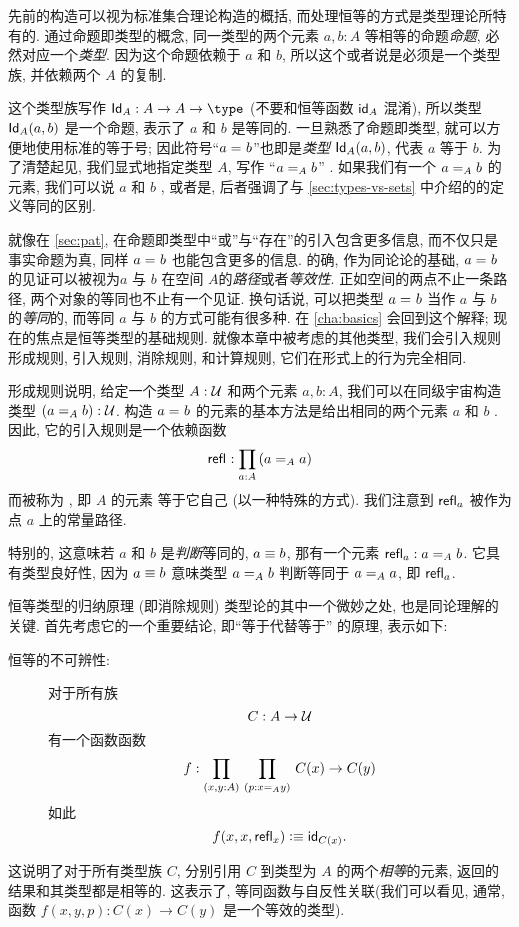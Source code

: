 %
%
%
%
先前的构造可以视为标准集合理论构造的概括, 而处理恒等的方式是类型理论所特有的. 通过命题即类型的概念, 同一类型的两个元素 $a,b:A$ 等相等的命题\emph{命题}, 必然对应一个\emph{类型}. 因为这个命题依赖于 $a$ 和 $b$, 所以这个或者说是必须是一个类型族, 并依赖两个 $A$ 的复制. 

这个类型族写作 $\idtypevar{A}:A\to A\to\type$ (不要和恒等函数 $\idfunc[A]$ 混淆), 所以类型 $\idtype[A]ab$ 是一个命题, 表示了 $a$ 和 $b$ 是等同的. 一旦熟悉了命题即类型, 就可以方便地使用标准的等于号; 因此符号``$\id{a}{b}$''也即是\emph{类型} $\idtype[A]ab$, 代表 $a$ 等于 $b$. 为了清楚起见, 我们显式地指定类型 $A$, 写作 ``$\id[A]{a}{b}$''  . 如果我们有一个 $\id[A]{a}{b}$ 的元素, 我们可以说 $a$ 和 $b$ , 或者是, 后者强调了与 \cref{sec:types-vs-sets} 中介绍的的定义等同的区别. %
%

就像在 \cref{sec:pat}, 在命题即类型中``或''与``存在''的引入包含更多信息, 而不仅只是事实命题为真, 同样 $\id{a}{b}$ 也能包含更多的信息. 的确, 作为同论论的基础, $\id{a}{b}$ 的见证可以被视为$a$ 与 $b$ 在空间 $A$的\emph{路径}或者\emph{等效性}. 正如空间的两点不止一条路径, 两个对象的等同也不止有一个见证. 换句话说, 可以把类型 $\id{a}{b}$ 当作 $a$ 与 $b$ 的\emph{等同}的, 而等同 $a$ 与 $b$ 的方式可能有很多种. 在 \cref{cha:basics} 会回到这个解释; 现在的焦点是恒等类型的基础规则. 就像本章中被考虑的其他类型, 我们会引入规则形成规则, 引入规则, 消除规则, 和计算规则, 它们在形式上的行为完全相同. 

形成规则说明, 给定一个类型 $A:\UU$ 和两个元素 $a,b:A$, 我们可以在同级宇宙构造类型 $(\id[A]{a}{b}):\UU$. 构造 $\id{a}{b}$ 的元素的基本方法是给出相同的两个元素 $a$ 和 $b$ . 因此, 它的引入规则是一个依赖函数 \[\refl{} : \prd{a:A} (\id[A]{a}{a})\]
而被称为 , %
即 $A$ 的元素  等于它自己 (以一种特殊的方式). 我们注意到 $\refl{a}$ 被作为 点 $a$ 上的常量路径. 

特别的, 这意味若 $a$ 和 $b$ 是\emph{判断}等同的, $a\jdeq b$, 那有一个元素 $\refl{a} : \id[A]{a}{b}$. 它具有类型良好性, 因为 $a\jdeq b$ 意味类型 $\id[A]{a}{b}$ 判断等同于 $\id[A]{a}{a}$, 即 $\refl{a}$. 

恒等类型的归纳原理 (即消除规则) 类型论的其中一个微妙之处, 也是同论理解的关键. 首先考虑它的一个重要结论, 即``等于代替等于'' 的原理, 表示如下: %
%
\begin{description}
\item[恒等的不可辨性:]
对于所有族  \[
C : A \to \UU \]
有一个函数函数 \[
f : \prd{x,y:A}{p:\id[A] x y} C(x) \to C(y) \]
如此 \[
f(x,x,\refl{x}) \defeq \idfunc[C(x)]. \]
\end{description}
这说明了对于所有类型族 $C$, 分别引用 $C$ 到类型为  $A$ 的两个\emph{相等}的元素, 返回的结果和其类型都是相等的. 这表示了, 等同函数与自反性关联(我们可以看见, 通常, 函数 $f(x,y,p): C(x) \to C(y)$ 是一个等效的类型). 

